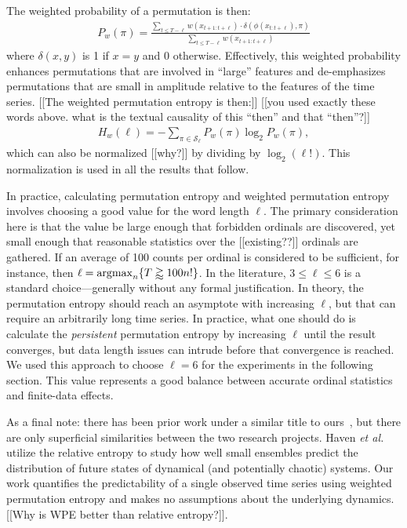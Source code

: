 The weighted probability of a permutation is then:
\begin{align*}
  P_w(\pi) = \frac{\displaystyle \sum_{t \le T - \ell} w(x_{t+1:t+\ell}) \cdot \delta(\phi(x_{t:t+\ell}), \pi) }{\displaystyle \sum_{t \le T - \ell} w(x_{t+1:t+\ell})}
\end{align*}
where $\delta(x, y)$ is 1 if $x = y$ and 0 otherwise. Effectively,
this weighted probability enhances permutations that are involved in
``large'' features and de-emphasizes permutations that are small in
amplitude relative to the features of the time series.  {\color{red}
  [[The weighted permutation entropy is then:]] [[you used exactly
      these words above.  what is the textual causality of this
      ``then'' and that ``then''?]]}
\begin{align*}
  H_w(\ell) = - \sum_{\pi \in \mathcal{S}_\ell} P_w(\pi) \log_2 P_w(\pi),
\end{align*}
which can also be normalized {\color{red} [[why?]]}  by dividing by
$\log_2(\ell!)$.  This normalization is used in all the results that
follow.

In practice, calculating permutation entropy and weighted permutation
entropy involves choosing a good value for the word length $\ell$. The
primary consideration here is that the value be large enough that
forbidden ordinals are discovered, yet small enough that reasonable
statistics over the {\color{red} [[existing??]]}  ordinals are
gathered.  If an average of 100 counts per ordinal is considered to be
sufficient, for instance, then $\ell =
\operatornamewithlimits{argmax}_n \{ T \gtrapprox 100 n! \}$.  In the
literature, $3 \le \ell \le 6$ is a standard choice---generally
without any formal justification.  In theory, the permutation entropy
should reach an asymptote with increasing $\ell$, but that can require
an arbitrarily long time series. In practice, what one should do is
calculate the \emph{persistent} permutation entropy by increasing
$\ell$ until the result converges, but data length issues can intrude
before that convergence is reached.  We used this approach to choose
$\ell = 6$ for the experiments in the following section.  This value
represents a good balance between accurate ordinal statistics and
finite-data effects.

As a final note: there has been prior work under a similar title to
ours~\cite{haven}, but there are only superficial similarities between
the two research projects.  Haven {\sl et al.} utilize the relative
entropy to study how well small ensembles predict the distribution of
future states of dynamical (and potentially chaotic) systems.  Our
work quantifies the predictability of a single observed time series
using weighted permutation entropy and makes no assumptions about the
underlying dynamics.  {\color{red}[[Why is WPE better than relative
      entropy?]]}.

